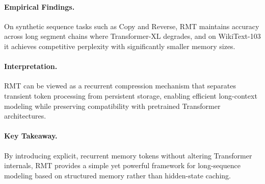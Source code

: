 \documentclass[12pt]{article}
\begin{document}
\paragraph{Empirical Findings.}
On synthetic sequence tasks such as Copy and Reverse, RMT maintains accuracy across long segment chains where
Transformer-XL degrades, and on WikiText-103 it achieves competitive perplexity with significantly smaller memory sizes.

\paragraph{Interpretation.}
RMT can be viewed as a recurrent compression mechanism that separates transient token processing from
persistent storage, enabling efficient long-context modeling while preserving compatibility with pretrained
Transformer architectures.

\paragraph{Key Takeaway.}
By introducing explicit, recurrent memory tokens without altering Transformer internals, RMT provides a
simple yet powerful framework for long-sequence modeling based on structured memory rather than hidden-state caching.
\end{document}
